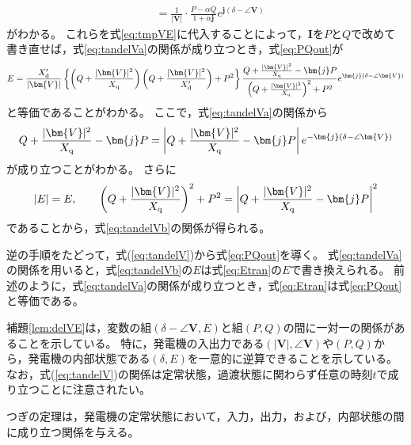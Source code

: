 \documentclass[tombow,dvipdfmx]{corona-a5-1.1}
\begin{document}
\begin{証明}
\begin{align*}
& =
\frac{1}{|\bm{V}|} \cdot
\frac{ P - \alpha Q}{ 1+\alpha \bm{j} }e^{\bm{j}(\delta - \angle \bm{V})}
\end{align*}
がわかる。
これらを式\ref{eq:tmpVE}に代入することによって，$\bm{I}$を$P$と$Q$で改めて書き直せば，式\ref{eq:tandelVa}の関係が成り立つとき，式\ref{eq:PQout}が
\begin{align}\label{eq:Etran}
E=
\frac{X_{\rm d}'}{|\bm{V}| } 
\left\{
\left(Q + \frac{|\bm{V}|^2}{X_{\rm q}} \right) \left(Q + \frac{|\bm{V}|^2}{X_{\rm d}'} \right) +P^2
\right\}
\frac{  Q + \tfrac{|\bm{V}|^2}{X_{\rm q}} - \bm{j} P }
{   \left( Q + \tfrac{|\bm{V}|^2}{X_{\rm q}} \right)^2 + P^2   }
e^{\bm{j}(\delta - \angle \bm{V})}
\end{align}
と等価であることがわかる。
ここで，式\ref{eq:tandelVa}の関係から
\begin{align*}
Q + \frac{|\bm{V}|^2}{X_{\rm q}} - \bm{j} P
= 
\left|Q + \frac{|\bm{V}|^2}{X_{\rm q}} - \bm{j} P \right|
e^{-\bm{j}(\delta - \angle \bm{V})}
\end{align*}
が成り立つことがわかる。
さらに
\[
|E|=E
,\qquad
\left( Q + \frac{|\bm{V}|^2}{X_{\rm q}} \right)^2 + P^2
=
\left|Q + \frac{|\bm{V}|^2}{X_{\rm q}} - \bm{j} P \right|^2
\]
であることから，式\ref{eq:tandelVb}の関係が得られる。

逆の手順をたどって，式(\ref{eq:tandelV})から式\ref{eq:PQout}を導く。
式\ref{eq:tandelVa}の関係を用いると，式\ref{eq:tandelVb}の$E$は式\ref{eq:Etran}の$E$で書き換えられる。
前述のように，式\ref{eq:tandelVa}の関係が成り立つとき，式\ref{eq:Etran}は式\ref{eq:PQout}と等価である。
\end{証明}

補題\ref{lem:delVE}は，変数の組$(\delta - \angle \bm{V},E)$と組$(P,Q)$の間に一対一の関係があることを示している。
特に，発電機の入出力である$(|\bm{V}|,\angle \bm{V})$や$(P,Q)$から，発電機の内部状態である$(\delta,E)$を一意的に逆算できることを示している。
なお，式(\ref{eq:tandelV})の関係は定常状態，過渡状態に関わらず任意の時刻$t$で成り立つことに注意されたい。

つぎの定理は，発電機の定常状態において，入力，出力，および，内部状態の間に成り立つ関係を与える。
\end{document}
